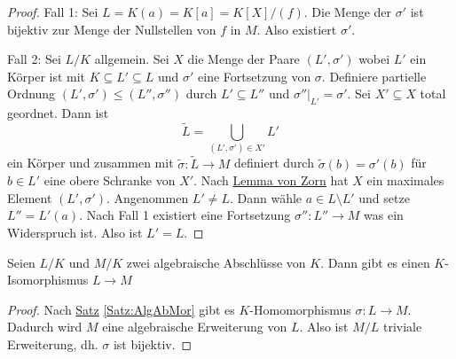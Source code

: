 \begin{proof}
    Fall 1: Sei \(L=K(a)=K[a]=K[X]/(f)\). Die Menge der \(\sigma'\) ist bijektiv zur Menge der Nullstellen von \(f\) in \(M\). Also existiert \(\sigma'\).
    
    Fall 2: Sei \(L/K\) allgemein. Sei \(X\) die Menge der Paare \((L',\sigma')\) wobei \(L'\) ein Körper ist mit \(K\subseteq L'\subseteq L\) und \(\sigma'\) eine Fortsetzung von \(\sigma\).
    Definiere partielle Ordnung \((L',\sigma')\leq (L'',\sigma'')\) durch \(L'\subseteq L''\) und \(\sigma''|_{L'}=\sigma'\).
    Sei \(X'\subseteq X\) total geordnet. Dann ist \[\tilde L=\bigcup\limits_{(L',\sigma')\in X'}L'\] ein Körper und zusammen mit \(\tilde\sigma\colon\tilde L\to M\) definiert durch \(\tilde\sigma(b)=\sigma'(b)\) für \(b\in L'\) eine obere Schranke von \(X'\).
    Nach \hyperref[Satz:Zorn]{Lemma von Zorn} hat \(X\) ein maximales Element \((L',\sigma')\).
    Angenommen \(L'\neq L\). Dann wähle \(a\in L\setminus L'\) und setze \(L''=L'(a)\). Nach Fall 1 existiert eine Fortsetzung \(\sigma''\colon L''\to M\) was ein Widerspruch ist. Also ist \(L'=L\). 
\end{proof}
\begin{Kor}
    Seien \(L/K\) und \(M/K\) zwei algebraische Abschlüsse von \(K\). Dann gibt es einen \(K\)-Isomorphismus \(L\to M\)
\end{Kor}
\begin{proof}
    Nach \hyperref[Satz:AlgAbMor]{Satz} \ref{Satz:AlgAbMor} gibt es \(K\)-Homomorphismus \(\sigma\colon L\to M\). Dadurch wird \(M\) eine algebraische Erweiterung von \(L\). Also ist \(M/L\) triviale Erweiterung, dh. \(\sigma\) ist bijektiv.
\end{proof}
